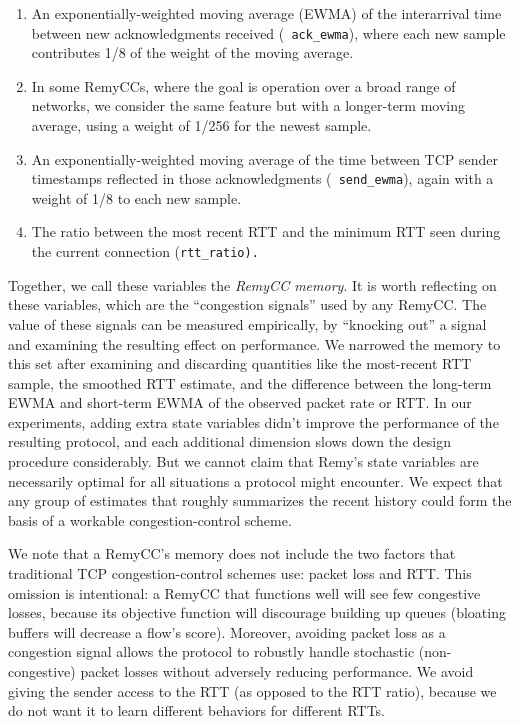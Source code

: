 \begin{enumerate}

\item An exponentially-weighted moving average (EWMA) of the
  interarrival time between new acknowledgments received ({\tt
    ack\_ewma}), where each new sample contributes 1/8 of the weight
  of the moving average.

\item In some RemyCCs, where the goal is operation over a broad range
  of networks, we consider the same feature but with a longer-term
  moving average, using a weight of 1/256 for the newest sample.

\item An exponentially-weighted moving average of the time between TCP
  sender timestamps reflected in those acknowledgments ({\tt
    send\_ewma}), again with a weight of 1/8 to each new sample.

\item The ratio between the most recent RTT and the minimum RTT seen
  during the current connection (\tt{rtt\_ratio}).

\end{enumerate}

Together, we call these variables the {\em RemyCC memory}. It is worth
reflecting on these variables, which are the ``congestion signals''
used by any RemyCC. The value of these signals can be measured
empirically, by ``knocking out'' a signal and examining the resulting
effect on performance. We narrowed the memory to this set after
examining and discarding quantities like the most-recent RTT sample,
the smoothed RTT estimate, and the difference between the long-term
EWMA and short-term EWMA of the observed packet rate or RTT. In our
experiments, adding extra state variables didn't improve the
performance of the resulting protocol, and each additional dimension
slows down the design procedure considerably. But we cannot claim that
Remy's state variables are necessarily optimal for all situations a
protocol might encounter. We expect that any group of estimates that
roughly summarizes the recent history could form the basis of a
workable congestion-control scheme.

We note that a RemyCC's memory does not include the two
factors that traditional TCP congestion-control schemes use: packet
loss and RTT. This omission is intentional: a RemyCC that functions
well will see few congestive losses, because its objective function
will discourage building up queues (bloating buffers will decrease a
flow's score).  Moreover, avoiding packet loss as a congestion signal
allows the protocol to robustly handle stochastic (non-congestive)
packet losses without adversely reducing performance. We
avoid giving the sender access to the RTT (as opposed to the RTT
ratio), because we do not want it to learn different behaviors for
different RTTs.

